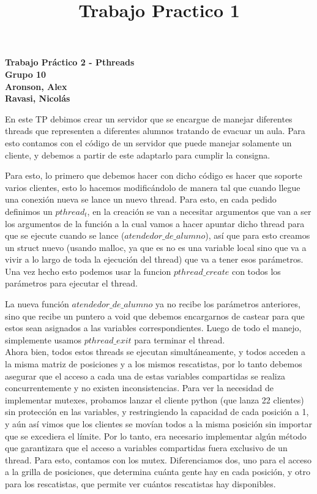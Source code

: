 \documentclass[a4paper, 11pt]{article}
\title{Trabajo Practico 1}
\begin{document}
\begin{center}
 \vspace{0,2cm}

\scriptsize{\textsf{\textbf{\large Trabajo Práctico 2 - Pthreads\\ Grupo 10 \\ Aronson, Alex  \vspace{0,05cm}\\ Ravasi, Nicolás}}}  \\
\end{center}

En este TP debimos crear un servidor que se encargue de manejar diferentes threads que representen a diferentes alumnos tratando de evacuar un aula. Para esto contamos con el código de un servidor que puede manejar solamente un cliente, y debemos a partir de este adaptarlo para cumplir la consigna.

Para esto, lo primero que debemos hacer con dicho código es hacer que soporte varios clientes, esto lo hacemos modificándolo de manera tal que cuando llegue una conexión nueva se lance un nuevo thread. Para esto, en cada pedido definimos un $pthread_t$, en la creación se van a necesitar argumentos que van a ser los argumentos de la función a la cual vamos a hacer apuntar dicho thread para que se ejecute  cuando se lance ($atendedor\_de\_alumno$), así que para esto creamos un struct nuevo (usando malloc, ya que es no es una variable local sino que va a vivir a lo largo de toda la ejecución del thread) que va a tener esos parámetros. Una vez hecho esto podemos usar la funcion $pthread\_create$ con todos los parámetros para ejecutar el thread.

La nueva función $atendedor\_de\_alumno$ ya no recibe los parámetros anteriores, sino que recibe un puntero a void que debemos encargarnos de castear para que estos sean asignados a las variables correspondientes. Luego de todo el manejo, simplemente usamos $pthread\_exit$ para terminar el thread.\\

Ahora bien, todos estos threads se ejecutan simultáneamente, y todos acceden a la misma matriz de posiciones y a los mismos rescatistas, por lo tanto debemos asegurar que el acceso a cada una de estas variables compartidas se realiza concurrentemente y no existen inconsistencias. Para ver la necesidad de implementar mutexes, probamos lanzar el cliente python (que lanza 22 clientes) sin protección en las variables, y restringiendo la capacidad de cada posición a 1, y aún así vimos que los clientes se movían todos a la misma posición sin importar que se excediera el límite. Por lo tanto, era necesario implementar algún método que garantizara que el acceso a variables compartidas fuera exclusivo de un thread. Para esto, contamos con los mutex. Diferenciamos dos, uno para el acceso a la grilla de posiciones, que determina cuánta gente hay en cada posición, y otro para los rescatistas, que permite ver cuántos rescatistas hay disponibles.
\end{document}
